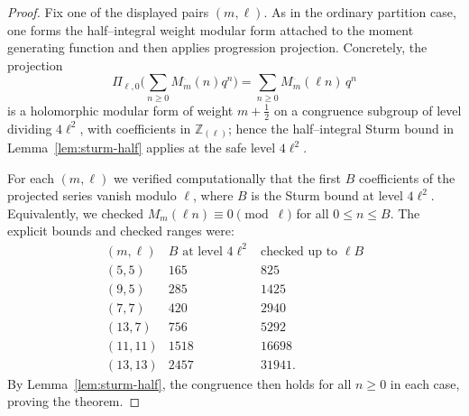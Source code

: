 \documentclass[10pt,a4paper]{amsart}
\begin{document}
\begin{proof}
Fix one of the displayed pairs $(m,\ell)$.  As in the ordinary partition case,
one forms the half--integral weight modular form attached to the moment
generating function and then applies progression projection.  Concretely, the
projection
\[
\Pi_{\ell,0}\Big(\sum_{n\ge0}M^{\overline{\ }}_m(n)q^n\Big)
=\sum_{n\ge0} M^{\overline{\ }}_m(\ell n)\,q^n
\]
is a holomorphic modular form of weight $m+\tfrac12$ on a congruence subgroup of
level dividing $4\ell^2$, with coefficients in $\mathbb{Z}_{(\ell)}$; hence the
half--integral Sturm bound in Lemma~\ref{lem:sturm-half} applies at the safe
level $4\ell^2$.

For each $(m,\ell)$ we verified computationally that the first $B$ coefficients
of the projected series vanish modulo $\ell$, where $B$ is the Sturm bound at
level $4\ell^2$.  Equivalently, we checked
$M^{\overline{\ }}_m(\ell n)\equiv 0\pmod{\ell}$ for all $0\le n\le B$.
The explicit bounds and checked ranges were:
\[
\begin{array}{c|c|c}
(m,\ell) & B \text{ at level } 4\ell^2 & \text{checked up to } \ell B \\ \hline
(5,5)   & 165  & 825 \\
(9,5)   & 285  & 1425 \\
(7,7)   & 420  & 2940 \\
(13,7)  & 756  & 5292 \\
(11,11) & 1518 & 16698 \\
(13,13) & 2457 & 31941.
\end{array}
\]
By Lemma~\ref{lem:sturm-half}, the congruence then holds for all $n\ge0$ in each
case, proving the theorem.
\end{proof}
\end{document}
